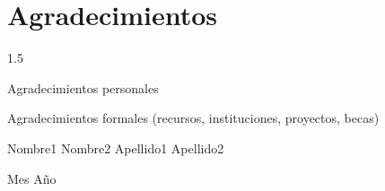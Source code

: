 \newpage

\section*{Agradecimientos}
\begin{spacing}{1.5}

Agradecimientos personales

\newpage
Agradecimientos formales (recursos, instituciones, proyectos, becas)

\end{spacing}

\begin{flushright}
Nombre1 Nombre2 Apellido1 Apellido2
\end{flushright}
\begin{flushright}
Mes Año
\end{flushright}
